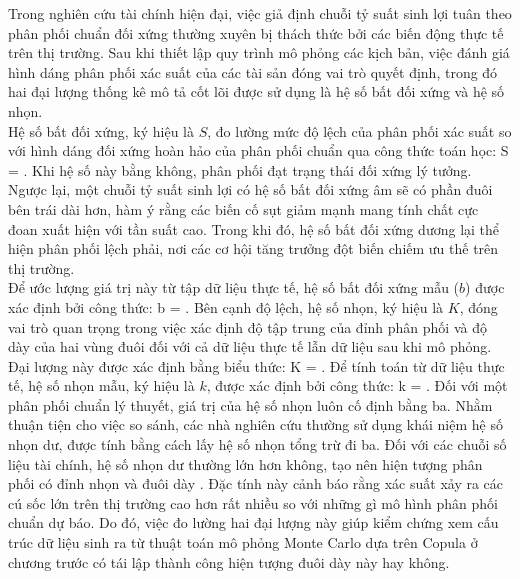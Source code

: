 Trong nghiên cứu tài chính hiện đại, việc giả định chuỗi tỷ suất sinh lợi tuân theo phân phối chuẩn đối xứng thường xuyên bị thách thức bởi các biến động thực tế trên thị trường. Sau khi thiết lập quy trình mô phỏng các kịch bản, việc đánh giá hình dáng phân phối xác suất của các tài sản đóng vai trò quyết định, trong đó hai đại lượng thống kê mô tả cốt lõi được sử dụng là hệ số bất đối xứng và hệ số nhọn.\\
Hệ số bất đối xứng, ký hiệu là $S$, đo lường mức độ lệch của phân phối xác suất so với hình dáng đối xứng hoàn hảo của phân phối chuẩn qua công thức toán học:
\bea
S =  .
\eea Khi hệ số này bằng không, phân phối đạt trạng thái đối xứng lý tưởng. Ngược lại, một chuỗi tỷ suất sinh lợi có hệ số bất đối xứng âm sẽ có phần đuôi bên trái dài hơn, hàm ý rằng các biến cố sụt giảm mạnh mang tính chất cực đoan xuất hiện với tần suất cao. Trong khi đó, hệ số bất đối xứng dương lại thể hiện phân phối lệch phải, nơi các cơ hội tăng trưởng đột biến chiếm ưu thế trên thị trường.\\
Để ước lượng giá trị này từ tập dữ liệu thực tế, hệ số bất đối xứng mẫu ($b$) được xác định bởi công thức:
\bea
b =  .
\eea
Bên cạnh độ lệch, hệ số nhọn, ký hiệu là $K$, đóng vai trò quan trọng trong việc xác định độ tập trung của đỉnh phân phối và độ dày của hai vùng đuôi đối với cả dữ liệu thực tế lẫn dữ liệu sau khi mô phỏng. Đại lượng này được xác định bằng biểu thức:
\bea
K =  .
\eea
Để tính toán từ dữ liệu thực tế, hệ số nhọn mẫu, ký hiệu là $k$, được xác định bởi công thức:
\bea
k =  .
\eea
Đối với một phân phối chuẩn lý thuyết, giá trị của hệ số nhọn luôn cố định bằng ba. Nhằm thuận tiện cho việc so sánh, các nhà nghiên cứu thường sử dụng khái niệm hệ số nhọn dư, được tính bằng cách lấy hệ số nhọn tổng trừ đi ba. Đối với các chuỗi số liệu tài chính, hệ số nhọn dư thường lớn hơn không, tạo nên hiện tượng phân phối có đỉnh nhọn và đuôi dày \cite{mcneil2015quantitative}. Đặc tính này cảnh báo rằng xác suất xảy ra các cú sốc lớn trên thị trường cao hơn rất nhiều so với những gì mô hình phân phối chuẩn dự báo. Do đó, việc đo lường hai đại lượng này giúp kiểm chứng xem cấu trúc dữ liệu sinh ra từ thuật toán mô phỏng Monte Carlo dựa trên Copula ở chương trước có tái lập thành công hiện tượng đuôi dày này hay không.
 